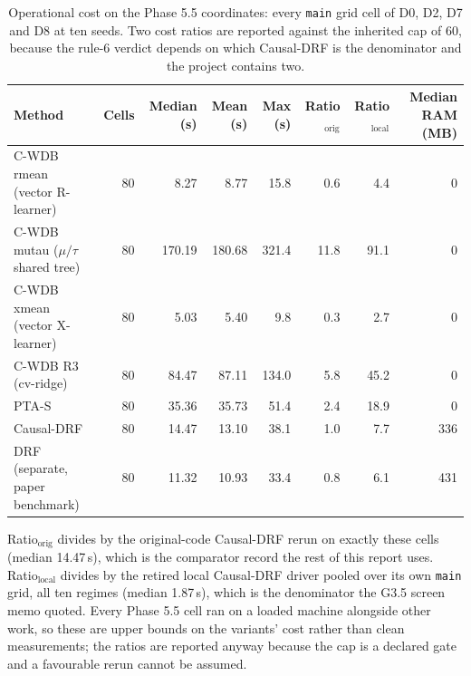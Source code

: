 \begin{table}[htbp]
\centering
\caption{Operational cost on the Phase 5.5 coordinates: every \texttt{main} grid cell of D0, D2, D7 and D8 at ten seeds. Two cost ratios are reported against the inherited cap of 60, because the rule-6 verdict depends on which Causal-DRF is the denominator and the project contains two.}
\label{tab:p55-cost}
\small
\begin{tabular}{@{}lrrrrrrr@{}}
\toprule
Method & Cells & Median (s) & Mean (s) & Max (s) & Ratio$_{\text{orig}}$ & Ratio$_{\text{local}}$ & Median RAM (MB) \\
\midrule
C-WDB rmean (vector R-learner) & 80 & 8.27 & 8.77 & 15.8 & 0.6 & 4.4 & 0 \\
C-WDB mutau ($\mu/\tau$ shared tree) & 80 & 170.19 & 180.68 & 321.4 & 11.8 & 91.1 & 0 \\
C-WDB xmean (vector X-learner) & 80 & 5.03 & 5.40 & 9.8 & 0.3 & 2.7 & 0 \\
C-WDB R3 (cv-ridge) & 80 & 84.47 & 87.11 & 134.0 & 5.8 & 45.2 & 0 \\
PTA-S & 80 & 35.36 & 35.73 & 51.4 & 2.4 & 18.9 & 0 \\
Causal-DRF & 80 & 14.47 & 13.10 & 38.1 & 1.0 & 7.7 & 336 \\
DRF (separate, paper benchmark) & 80 & 11.32 & 10.93 & 33.4 & 0.8 & 6.1 & 431 \\
\bottomrule
\end{tabular}
\par\vspace{2pt}\parbox{0.94\textwidth}{\scriptsize Ratio$_{\text{orig}}$ divides by the original-code Causal-DRF rerun on exactly these cells (median 14.47\,s), which is the comparator record the rest of this report uses. Ratio$_{\text{local}}$ divides by the retired local Causal-DRF driver pooled over its own \texttt{main} grid, all ten regimes (median 1.87\,s), which is the denominator the G3.5 screen memo quoted. Every Phase 5.5 cell ran on a loaded machine alongside other work, so these are upper bounds on the variants' cost rather than clean measurements; the ratios are reported anyway because the cap is a declared gate and a favourable rerun cannot be assumed.}
\end{table}
